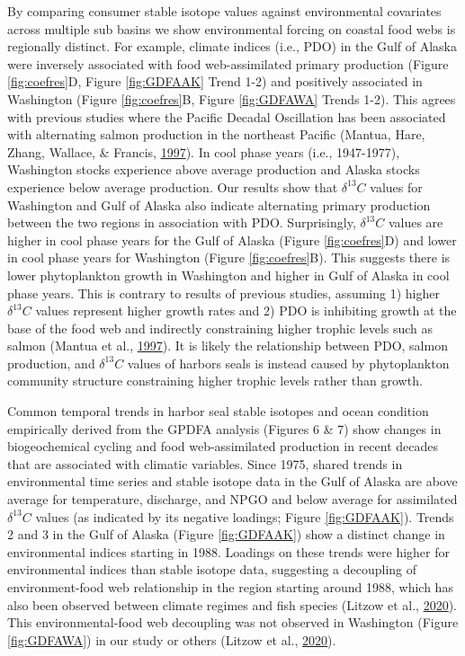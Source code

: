 \documentclass [11pt, proquest] {uwthesis}[2015/03/03]
\begin{document}
By comparing consumer stable isotope values against environmental
covariates across multiple sub basins we show environmental forcing on
coastal food webs is regionally distinct. For example, climate indices
(i.e., PDO) in the Gulf of Alaska were inversely associated with food
web-assimilated primary production (Figure \ref{fig:coefres}D, Figure
\ref{fig:GDFAAK} Trend 1-2) and positively associated in Washington
(Figure \ref{fig:coefres}B, Figure \ref{fig:GDFAWA} Trends 1-2). This
agrees with previous studies where the Pacific Decadal Oscillation has
been associated with alternating salmon production in the northeast
Pacific (Mantua, Hare, Zhang, Wallace, \& Francis,
\protect\hyperlink{ref-Mantua1997}{1997}). In cool phase years (i.e.,
1947-1977), Washington stocks experience above average production and
Alaska stocks experience below average production. Our results show that
\(\delta^{13}C\) values for Washington and Gulf of Alaska also indicate
alternating primary production between the two regions in association
with PDO. Surprisingly, \(\delta^{13}C\) values are higher in cool phase
years for the Gulf of Alaska (Figure \ref{fig:coefres}D) and lower in
cool phase years for Washington (Figure \ref{fig:coefres}B). This
suggests there is lower phytoplankton growth in Washington and higher in
Gulf of Alaska in cool phase years. This is contrary to results of
previous studies, assuming 1) higher \(\delta^{13}C\) values represent
higher growth rates and 2) PDO is inhibiting growth at the base of the
food web and indirectly constraining higher trophic levels such as
salmon (Mantua et al., \protect\hyperlink{ref-Mantua1997}{1997}). It is
likely the relationship between PDO, salmon production, and
\(\delta^{13}C\) values of harbors seals is instead caused by
phytoplankton community structure constraining higher trophic levels
rather than growth.

Common temporal trends in harbor seal stable isotopes and ocean
condition empirically derived from the GPDFA analysis (Figures 6 \& 7)
show changes in biogeochemical cycling and food web-assimilated
production in recent decades that are associated with climatic
variables. Since 1975, shared trends in environmental time series and
stable isotope data in the Gulf of Alaska are above average for
temperature, discharge, and NPGO and below average for assimilated
\(\delta^{13}C\) values (as indicated by its negative loadings; Figure
\ref{fig:GDFAAK}). Trends 2 and 3 in the Gulf of Alaska (Figure
\ref{fig:GDFAAK}) show a distinct change in environmental indices
starting in 1988. Loadings on these trends were higher for environmental
indices than stable isotope data, suggesting a decoupling of
environment-food web relationship in the region starting around 1988,
which has also been observed between climate regimes and fish species
(Litzow et al., \protect\hyperlink{ref-Litzow2020}{2020}). This
environmental-food web decoupling was not observed in Washington (Figure
\ref{fig:GDFAWA}) in our study or others (Litzow et al.,
\protect\hyperlink{ref-Litzow2020}{2020}).
\end{document}
